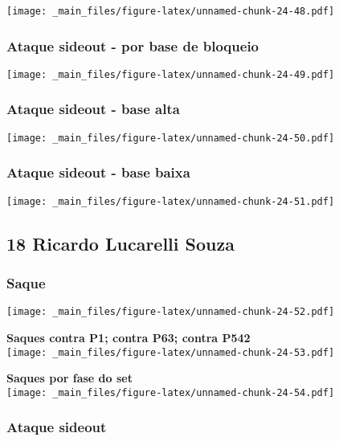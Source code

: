 \documentclass[
]{book}
\begin{document}
\texttt{[image: \_main\_files/figure-latex/unnamed-chunk-24-48.pdf]}

\subsubsection*{Ataque sideout - por base de bloqueio}\label{ataque-sideout---por-base-de-bloqueio-2}

\texttt{[image: \_main\_files/figure-latex/unnamed-chunk-24-49.pdf]}

\subsubsection*{Ataque sideout - base alta}\label{ataque-sideout---base-alta-2}

\texttt{[image: \_main\_files/figure-latex/unnamed-chunk-24-50.pdf]}

\subsubsection*{Ataque sideout - base baixa}\label{ataque-sideout---base-baixa-2}

\texttt{[image: \_main\_files/figure-latex/unnamed-chunk-24-51.pdf]} \newpage

\subsection{18 Ricardo Lucarelli Souza}\label{ricardo-lucarelli-souza}

\subsubsection{Saque}\label{saque-3}

\texttt{[image: \_main\_files/figure-latex/unnamed-chunk-24-52.pdf]}

\textbf{Saques contra P1; contra P63; contra P542}\\
\texttt{[image: \_main\_files/figure-latex/unnamed-chunk-24-53.pdf]}

\textbf{Saques por fase do set}\\
\texttt{[image: \_main\_files/figure-latex/unnamed-chunk-24-54.pdf]} \pagebreak

\subsubsection{Ataque sideout}\label{ataque-sideout-3}
\end{document}
